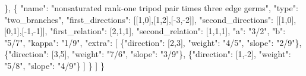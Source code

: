 \documentclass[
  11pt,
]{article}
\newenvironment{Shaded}{}{}
\newcommand{\DataTypeTok}[1]{\textcolor[rgb]{0.56,0.13,0.00}{#1}}
\newcommand{\DecValTok}[1]{\textcolor[rgb]{0.25,0.63,0.44}{#1}}
\newcommand{\FunctionTok}[1]{\textcolor[rgb]{0.02,0.16,0.49}{#1}}
\newcommand{\OtherTok}[1]{\textcolor[rgb]{0.00,0.44,0.13}{#1}}
\newcommand{\StringTok}[1]{\textcolor[rgb]{0.25,0.44,0.63}{#1}}
\begin{document}
\begin{Shaded}
\begin{Highlighting}[]
    \FunctionTok{\}}\OtherTok{,}
    \FunctionTok{\{}
      \DataTypeTok{"name"}\FunctionTok{:} \StringTok{"nonsaturated rank{-}one tripod pair times three edge germs"}\FunctionTok{,}
      \DataTypeTok{"type"}\FunctionTok{:} \StringTok{"two\_branches"}\FunctionTok{,}
      \DataTypeTok{"first\_directions"}\FunctionTok{:} \OtherTok{[[}\DecValTok{1}\OtherTok{,}\DecValTok{0}\OtherTok{],[}\DecValTok{1}\OtherTok{,}\DecValTok{2}\OtherTok{],[}\DecValTok{{-}3}\OtherTok{,}\DecValTok{{-}2}\OtherTok{]]}\FunctionTok{,}
      \DataTypeTok{"second\_directions"}\FunctionTok{:} \OtherTok{[[}\DecValTok{1}\OtherTok{,}\DecValTok{0}\OtherTok{],[}\DecValTok{0}\OtherTok{,}\DecValTok{1}\OtherTok{],[}\DecValTok{{-}1}\OtherTok{,}\DecValTok{{-}1}\OtherTok{]]}\FunctionTok{,}
      \DataTypeTok{"first\_relation"}\FunctionTok{:} \OtherTok{[}\DecValTok{2}\OtherTok{,}\DecValTok{1}\OtherTok{,}\DecValTok{1}\OtherTok{]}\FunctionTok{,} \DataTypeTok{"second\_relation"}\FunctionTok{:} \OtherTok{[}\DecValTok{1}\OtherTok{,}\DecValTok{1}\OtherTok{,}\DecValTok{1}\OtherTok{]}\FunctionTok{,}
      \DataTypeTok{"a"}\FunctionTok{:} \StringTok{"3/2"}\FunctionTok{,} \DataTypeTok{"b"}\FunctionTok{:} \StringTok{"5/7"}\FunctionTok{,} \DataTypeTok{"kappa"}\FunctionTok{:} \StringTok{"1/9"}\FunctionTok{,}
      \DataTypeTok{"extra"}\FunctionTok{:} \OtherTok{[}
        \FunctionTok{\{}\DataTypeTok{"direction"}\FunctionTok{:} \OtherTok{[}\DecValTok{2}\OtherTok{,}\DecValTok{3}\OtherTok{]}\FunctionTok{,} \DataTypeTok{"weight"}\FunctionTok{:} \StringTok{"4/5"}\FunctionTok{,} \DataTypeTok{"slope"}\FunctionTok{:} \StringTok{"2/9"}\FunctionTok{\}}\OtherTok{,}
        \FunctionTok{\{}\DataTypeTok{"direction"}\FunctionTok{:} \OtherTok{[}\DecValTok{3}\OtherTok{,}\DecValTok{5}\OtherTok{]}\FunctionTok{,} \DataTypeTok{"weight"}\FunctionTok{:} \StringTok{"7/6"}\FunctionTok{,} \DataTypeTok{"slope"}\FunctionTok{:} \StringTok{"3/9"}\FunctionTok{\}}\OtherTok{,}
        \FunctionTok{\{}\DataTypeTok{"direction"}\FunctionTok{:} \OtherTok{[}\DecValTok{1}\OtherTok{,}\DecValTok{{-}2}\OtherTok{]}\FunctionTok{,} \DataTypeTok{"weight"}\FunctionTok{:} \StringTok{"5/8"}\FunctionTok{,} \DataTypeTok{"slope"}\FunctionTok{:} \StringTok{"4/9"}\FunctionTok{\}}
      \OtherTok{]}
    \FunctionTok{\}}
  \OtherTok{]}
\FunctionTok{\}}
\end{Highlighting}
\end{Shaded}
\end{document}

